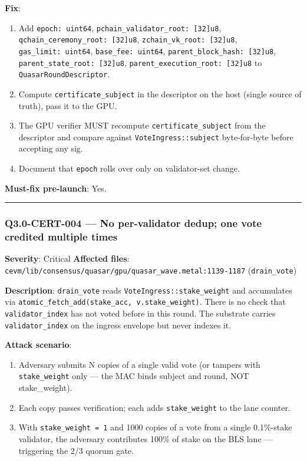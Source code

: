 \documentclass[
]{article}
\providecommand{\tightlist}{%
  \setlength{\itemsep}{0pt}\setlength{\parskip}{0pt}}
\begin{document}
\textbf{Fix}:

\begin{enumerate}
\def\labelenumi{\arabic{enumi}.}
\tightlist
\item
  Add \texttt{epoch:\ uint64},
  \texttt{pchain\_validator\_root:\ {[}32{]}u8},
  \texttt{qchain\_ceremony\_root:\ {[}32{]}u8},
  \texttt{zchain\_vk\_root:\ {[}32{]}u8}, \texttt{gas\_limit:\ uint64},
  \texttt{base\_fee:\ uint64},
  \texttt{parent\_block\_hash:\ {[}32{]}u8},
  \texttt{parent\_state\_root:\ {[}32{]}u8},
  \texttt{parent\_execution\_root:\ {[}32{]}u8} to
  \texttt{QuasarRoundDescriptor}.
\item
  Compute \texttt{certificate\_subject} in the descriptor on the host
  (single source of truth), pass it to the GPU.
\item
  The GPU verifier MUST recompute \texttt{certificate\_subject} from the
  descriptor and compare against \texttt{VoteIngress::subject}
  byte-for-byte before accepting any sig.
\item
  Document that \texttt{epoch} rolls over only on validator-set change.
\end{enumerate}

\textbf{Must-fix pre-launch}: Yes.

\begin{center}\rule{0.5\linewidth}{0.5pt}\end{center}

\subsubsection{Q3.0-CERT-004 --- No per-validator dedup; one vote
credited multiple
times}\label{q30-cert-004--no-per-validator-dedup-one-vote-credited-multiple-times}

\textbf{Severity}: Critical \textbf{Affected files}:
\texttt{cevm/lib/consensus/quasar/gpu/quasar\_wave.metal:1139-1187}
(\texttt{drain\_vote})

\textbf{Description}: \texttt{drain\_vote} reads
\texttt{VoteIngress::stake\_weight} and accumulates via
\texttt{atomic\_fetch\_add(stake\_acc,\ v.stake\_weight)}. There is no
check that \texttt{validator\_index} has not voted before in this round.
The substrate carries \texttt{validator\_index} on the ingress envelope
but never indexes it.

\textbf{Attack scenario}:

\begin{enumerate}
\def\labelenumi{\arabic{enumi}.}
\tightlist
\item
  Adversary submits N copies of a single valid vote (or tampers with
  \texttt{stake\_weight} only --- the MAC binds subject and round, NOT
  stake\_weight).
\item
  Each copy passes verification; each adds \texttt{stake\_weight} to the
  lane counter.
\item
  With \texttt{stake\_weight\ =\ 1} and 1000 copies of a vote from a
  single 0.1\%-stake validator, the adversary contributes 100\% of stake
  on the BLS lane --- triggering the 2/3 quorum gate.
\end{enumerate}
\end{document}
